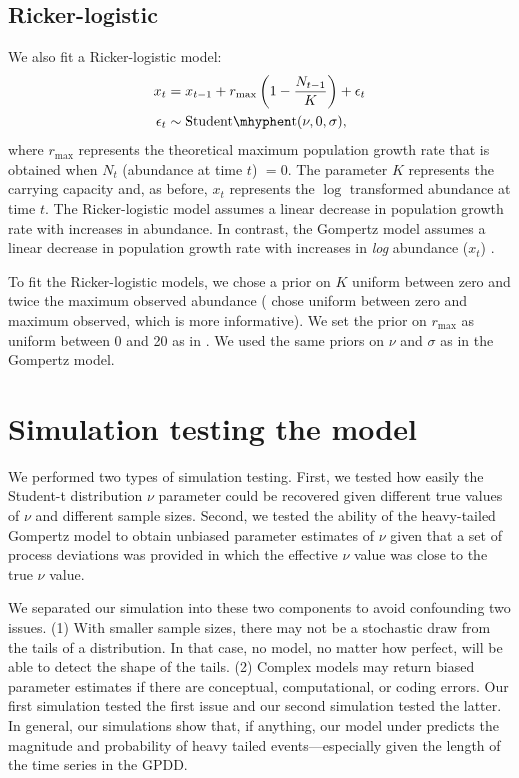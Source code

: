 \subsection{Ricker-logistic}

We also fit a Ricker-logistic model:
\begin{align*}
x_t &= x_{t-1} + r_{\mathrm{max}}\left(1 - \frac{N_{t-1}}{K}\right) + \epsilon_t\\
\epsilon_t &\sim \mathrm{Student\mhyphen t}(\nu, 0, \sigma),
\end{align*}
where $r_\mathrm{max}$ represents the theoretical maximum population growth
rate that is obtained when $N_t$ (abundance at time $t$) $= 0$. The parameter
$K$ represents the carrying capacity and, as before, $x_t$ represents the
$\log$ transformed abundance at time $t$. The Ricker-logistic model assumes a
linear decrease in population growth rate with increases in abundance. In
contrast, the Gompertz model assumes a linear decrease in population growth
rate with increases in \textit{log} abundance ($x_t$)
\citep[e.g.][]{thibaut2012}.

To fit the Ricker-logistic models, we chose a prior on $K$ uniform between
zero and twice the maximum observed abundance (\citet{clark2010} chose uniform
between zero and maximum observed, which is more informative). We set the
prior on $r_\mathrm{max}$ as uniform between 0 and 20 as in \citet{clark2010}.
We used the same priors on $\nu$ and $\sigma$ as in the Gompertz model.

\section{Simulation testing the model}

We performed two types of simulation testing. First, we tested how easily the
Student-t distribution $\nu$ parameter could be recovered given different true
values of $\nu$ and different sample sizes. Second, we tested the ability of
the heavy-tailed Gompertz model to obtain unbiased parameter estimates of
$\nu$ given that a set of process deviations was provided in which the
effective $\nu$ value was close to the true $\nu$ value.

We separated our simulation into these two components to avoid confounding two
issues. (1) With smaller sample sizes, there may not be a stochastic draw from
the tails of a distribution. In that case, no model, no matter how perfect,
will be able to detect the shape of the tails. (2) Complex models may return
biased parameter estimates if there are conceptual, computational, or coding
errors. Our first simulation tested the first issue and our second simulation
tested the latter. In general, our simulations show that, if anything, our
model under predicts the magnitude and probability of heavy tailed
events---especially given the length of the time series in the GPDD.

